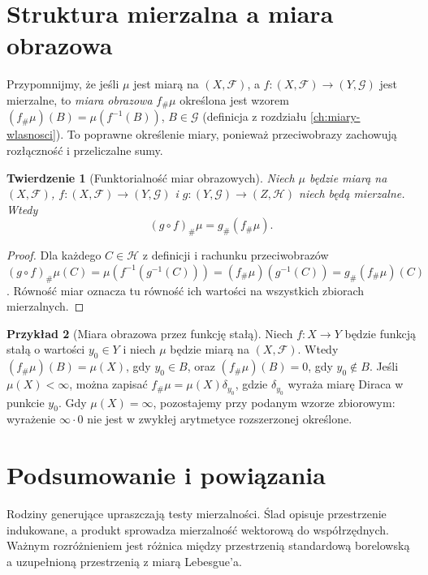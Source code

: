 \documentclass[11pt,a4paper,oneside]{book}
\numberwithin{equation}{chapter}
\theoremstyle{plain}
\newtheorem{twierdzenie}{Twierdzenie}[chapter]
\theoremstyle{definition}
\newtheorem{przyklad}[twierdzenie]{Przykład}
\theoremstyle{remark}
\begin{document}
\section{Struktura mierzalna a miara obrazowa}

Przypomnijmy, że jeśli $\mu$ jest miarą na $(X,\mathcal F)$,
a $f:(X,\mathcal F)\to(Y,\mathcal G)$ jest mierzalne,
to \emph{miara obrazowa} $f_\#\mu$ określona jest wzorem
$(f_\#\mu)(B)=\mu(f^{-1}(B))$, $B\in\mathcal G$
(definicja z rozdziału \ref{ch:miary-wlasnosci}).
To poprawne określenie miary, ponieważ przeciwobrazy
zachowują rozłączność i przeliczalne sumy.

\begin{twierdzenie}[Funktorialność miar obrazowych]
\label{thm:pushforward-composition}
Niech $\mu$ będzie miarą na $(X,\mathcal F)$,
$f:(X,\mathcal F)\to(Y,\mathcal G)$ i
$g:(Y,\mathcal G)\to(Z,\mathcal H)$ niech będą mierzalne.
Wtedy
\[
(g\circ f)_\#\mu=g_\#(f_\#\mu).
\]
\end{twierdzenie}
\begin{proof}
Dla każdego $C\in\mathcal H$ z definicji i
rachunku przeciwobrazów
$(g\circ f)_\#\mu(C)=\mu(f^{-1}(g^{-1}(C)))
=(f_\#\mu)(g^{-1}(C))=g_\#(f_\#\mu)(C)$.
Równość miar oznacza tu równość ich wartości
na wszystkich zbiorach mierzalnych.
\end{proof}

\begin{przyklad}[Miara obrazowa przez funkcję stałą]
Niech $f:X\to Y$ będzie funkcją stałą o wartości
$y_0\in Y$ i niech $\mu$ będzie miarą na $(X,\mathcal F)$.
Wtedy $(f_\#\mu)(B)=\mu(X)$, gdy $y_0\in B$, oraz
$(f_\#\mu)(B)=0$, gdy $y_0\notin B$. Jeśli $\mu(X)<\infty$, można zapisać
$f_\#\mu=\mu(X)\delta_{y_0}$, gdzie $\delta_{y_0}$
wyraża miarę Diraca w punkcie $y_0$.
Gdy $\mu(X)=\infty$, pozostajemy przy podanym wzorze
zbiorowym: wyrażenie $\infty\cdot0$ nie jest w zwykłej
arytmetyce rozszerzonej określone.
\end{przyklad}

\section{Podsumowanie i powiązania}

Rodziny generujące upraszczają testy mierzalności.
Ślad opisuje przestrzenie indukowane, a produkt
sprowadza mierzalność wektorową do współrzędnych.
Ważnym rozróżnieniem jest różnica między przestrzenią
standardową borelowską a uzupełnioną przestrzenią
z miarą Lebesgue'a.
\end{document}
